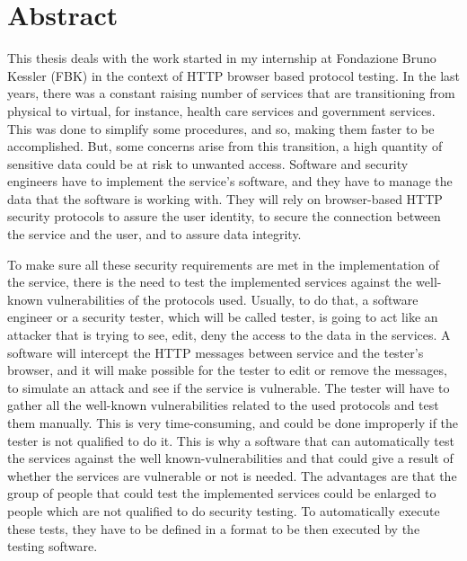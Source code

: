 \chapter*{Abstract} %

This thesis deals with the work started in my internship at Fondazione Bruno Kessler (FBK) in the context of HTTP browser based protocol testing.
In the last years, there was a constant raising number of services that are transitioning from physical to virtual, for instance, health care services and government services. This was done to simplify some procedures, and so, making them faster to be accomplished. But, some concerns arise from this transition, a high quantity of sensitive data could be at risk to unwanted access. Software and security engineers have to implement the service's software, and they have to manage the data that the software is working with. They will rely on browser-based HTTP security protocols to assure the user identity, to secure the connection between the service and the user, and to assure data integrity. 

To make sure all these security requirements are met in the implementation of the service, there is the need to test the implemented services against the well-known vulnerabilities of the protocols used. Usually, to do that, a software engineer or a security tester, which will be called tester, is going to act like an attacker that is trying to see, edit, deny the access to the data in the services. A software will intercept the HTTP messages between service and the tester's browser, and it will make possible for the tester to edit or remove the messages, to simulate an attack and see if the service is vulnerable. The tester will have to gather all the well-known vulnerabilities related to the used protocols and test them manually. This is very time-consuming, and could be done improperly if the tester is not qualified to do it. This is why a software that can automatically test the services against the well known-vulnerabilities and that could give a result of whether the services are vulnerable or not is needed. The advantages are that the group of people that could test the implemented services could be enlarged to people which are not qualified to do security testing. To automatically execute these tests, they have to be defined in a format to be then executed by the testing software. 


